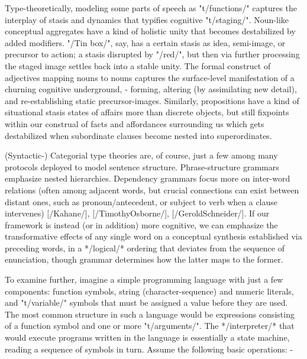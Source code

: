 Type-theoretically, modeling some parts of speech as 
"t/functions/" captures the 
interplay of stasis and dynamics that typifies 
cognitive "t/staging/".  Noun-like conceptual 
aggregates have a kind of holistic unity that becomes 
destabilized by added modifiers.  "/Tin box/", say, 
has a certain stasis as idea, semi-image, or 
precursor to action; a stasis disrupted by "/red/", but 
then via further processing the staged image settles 
back into a stable unity.  The formal construct 
of adjectives mapping nouns to nouns captures the 
surface-level manifestation of a churning cognitive 
underground, -%
forming, altering (by assimilating new detail), and 
re-establishing static precursor-images.  Similarly, propositions 
have a kind of situational stasis %
states of affairs more than 
discrete objects, but still fixpoints within 
our construal of facts and affordances surrounding us %
which gets destabilized when subordinate clauses become nested into 
superordinates.

(Syntactic-) Categorial type theories are, of course, just a few among many protocols 
deployed to model sentence structure.  Phrase-structure grammars emphasize 
nested hierarchies.  Dependency grammars  
focus more on inter-word relations (often among adjacent words, but crucial 
connections can exist between distant ones, such as pronoun/antecedent, 
or subject to verb when a clause intervenes) 
[/Kahane/], [/TimothyOsborne/], [/GeroldSchneider/].  
If our framework is instead (or in addition) more 
cognitive, we can emphasize the transformative effects 
of any single word on a conceptual synthesis established 
via preceding words, in a */logical/* ordering that 
deviates from the sequence of enunciation, though grammar 
determines how the latter maps to the former.  

To examine further, imagine a simple programming language with 
just a few components: function symbols, string (character-sequence) 
and numeric literals, and "t/variable/" 
symbols that must be assigned a value before they are used. 
The most common structure in such a language would be expressions consisting of a function 
symbol and one or more "t/arguments/".  The */interpreter/* 
that would execute programs written in the language is essentially 
a state machine, reading a sequence of symbols 
in turn.  Assume the following basic operations: -%


